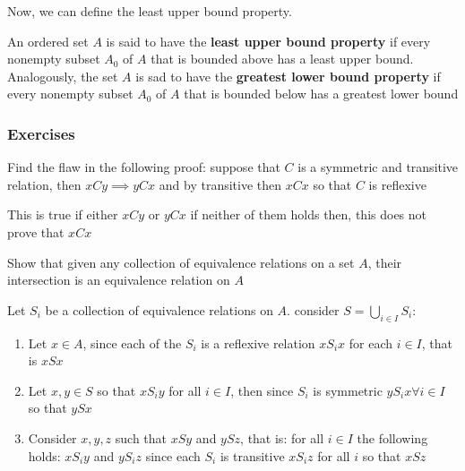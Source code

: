 Now, we can define the least upper bound property.

\begin{defn}
	An ordered set $ A $ is said to have the \textbf{least upper bound property} if every nonempty subset $ A_0 $ of $ A $ that is bounded above has a least upper bound. Analogously, the set $ A $ is sad to have the \textbf{greatest lower bound property} if every nonempty subset $ A_0 $ of $ A $ that is bounded below has a greatest lower bound
\end{defn}
\subsubsection{Exercises}
\begin{exc}
	Find the flaw in the following proof: suppose that $ C $ is a symmetric and transitive relation, then $ xCy \implies yCx $ and by transitive then $ xCx $ so that $ C $ is reflexive
\end{exc}
\begin{sol}
	This is true if either $ xCy $ or $ yCx $ if neither of them holds then, this does not prove that $ xCx $
\end{sol}
\begin{exc}
	Show that given any collection of equivalence relations on a set $ A $, their intersection is an equivalence relation on $ A $
\end{exc}
\begin{sol}
	Let $ S_i $ be a collection of equivalence relations on $ A $. consider $ S = \bigcup_{i \in I}S_i $:
	\begin{enumerate}
		\item Let $ x \in A $, since each of the $ S_i  $ is a reflexive relation $ xS_ix $ for each $ i \in I $, that is $ xSx $
		\item Let $ x,y \in S  $ so that $ xS_i y $ for all $ i \in I $, then since $ S_i $ is symmetric $ yS_i x \forall i \in I $ so that $ ySx $
		\item Consider $ x,y,z $ such that $ xSy $ and $ ySz $, that is: for all $ i \in I $ the following holds: $ xS_i y $ and $ y S_i z $ since each $ S_i  $ is transitive $ x S_i z $ for all  $ i $ so that $ xSz $
	\end{enumerate}
\end{sol}


